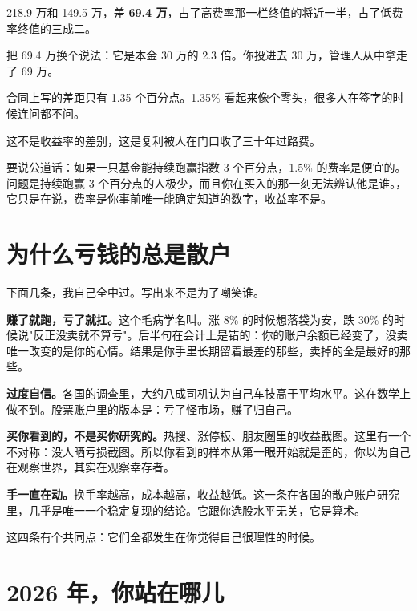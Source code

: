 \begin{barfig}
\end{barfig}

218.9 万和 149.5 万，差 \textbf{69.4 万}，占了高费率那一栏终值的将近一半，占了低费率终值的三成二。

把 69.4 万换个说法：它是本金 30 万的 2.3 倍。你投进去 30 万，管理人从中拿走了 69 万。

合同上写的差距只有 1.35 个百分点。1.35\% 看起来像个零头，很多人在签字的时候连问都不问。

\begin{pullquote}{}
这不是收益率的差别，这是复利被人在门口收了三十年过路费。
\end{pullquote}

要说公道话：如果一只基金能持续跑赢指数 3 个百分点，1.5\% 的费率是便宜的。问题是持续跑赢 3 个百分点的人极少，而且你在买入的那一刻无法辨认他是谁。，它只是在说，费率是你事前唯一能确定知道的数字，收益率不是。

\section{为什么亏钱的总是散户}

下面几条，我自己全中过。写出来不是为了嘲笑谁。

\textbf{赚了就跑，亏了就扛。}这个毛病学名叫。涨 8\% 的时候想落袋为安，跌 30\% 的时候说"反正没卖就不算亏"。后半句在会计上是错的：你的账户余额已经变了，没卖唯一改变的是你的心情。结果是你手里长期留着最差的那些，卖掉的全是最好的那些。

\textbf{过度自信。}各国的调查里，大约八成司机认为自己车技高于平均水平。这在数学上做不到。股票账户里的版本是：亏了怪市场，赚了归自己。

\textbf{买你看到的，不是买你研究的。}热搜、涨停板、朋友圈里的收益截图。这里有一个不对称：没人晒亏损截图。所以你看到的样本从第一眼开始就是歪的，你以为自己在观察世界，其实在观察幸存者。

\textbf{手一直在动。}换手率越高，成本越高，收益越低。这一条在各国的散户账户研究里，几乎是唯一一个稳定复现的结论。它跟你选股水平无关，它是算术。

这四条有个共同点：它们全都发生在你觉得自己很理性的时候。

\section{2026 年，你站在哪儿}


